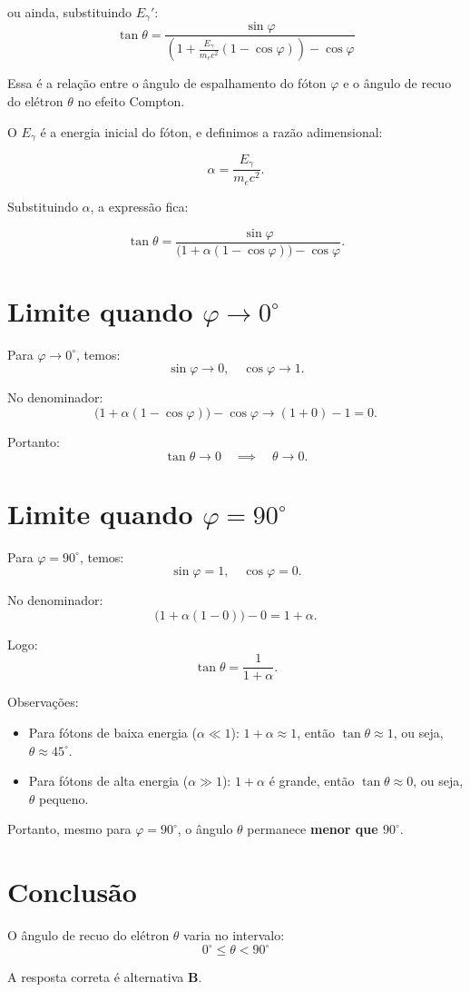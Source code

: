 \documentclass[a4paper,12pt]{article}
\begin{document}
\begin{flushleft}
ou ainda, substituindo \( E_\gamma' \):
\[
\tan\theta =
\frac{\sin\varphi}{\displaystyle \left( 1 + \frac{E_\gamma}{m_e c^2}(1 - \cos\varphi) \right) - \cos\varphi}
\]

Essa é a relação entre o ângulo de espalhamento do fóton \( \varphi \) e o ângulo de recuo do elétron \( \theta \) no efeito Compton.

O \(E_\gamma\) é a energia inicial do fóton, e definimos a razão adimensional:

\[
\alpha =
\frac{E_\gamma}{m_e c^2}.
\]

Substituindo \(\alpha\), a expressão fica:

\[
\tan\theta =
\frac{\sin\varphi}{
\big(1 + \alpha(1-\cos\varphi)\big) - \cos\varphi}.
\]

\section*{Limite quando \(\varphi \to 0^\circ\)}

Para \(\varphi \to 0^\circ\), temos:
\[
\sin\varphi \to 0, \quad \cos\varphi \to 1.
\]

No denominador:
\[
\big(1 + \alpha(1-\cos\varphi)\big) - \cos\varphi 
\to (1 + 0) - 1 = 0.
\]

Portanto:
\[
\tan\theta \to 0 \quad \implies \quad \theta \to 0.
\]

\section*{Limite quando \(\varphi = 90^\circ\)}

Para \(\varphi = 90^\circ\), temos:
\[
\sin\varphi = 1, \quad \cos\varphi = 0.
\]

No denominador:
\[
\big(1 + \alpha(1-0)\big) - 0 =
1 + \alpha.
\]

Logo:
\[
\tan\theta =
\frac{1}{1+\alpha}.
\]

Observações:
\begin{itemize}
    \item Para fótons de baixa energia (\(\alpha \ll 1\)): \(1+\alpha \approx1\), então \(\tan\theta\approx1\), ou seja, \(\theta\approx45^\circ\).
    \item Para fótons de alta energia (\(\alpha\gg1\)): \(1+\alpha\) é grande, então \(\tan\theta\approx0\), ou seja, \(\theta\) pequeno.
\end{itemize}

Portanto, mesmo para \(\varphi=90^\circ\), o ângulo \(\theta\) permanece \textbf{menor que \(90^\circ\)}.

\section*{Conclusão}

O ângulo de recuo do elétron \(\theta\) varia no intervalo:
\[
\boxed{0^\circ \leq \theta < 90^\circ}
\]


A resposta correta é alternativa \colorbox{green!50}{\textbf{B}}.
\end{flushleft}
\end{document}
